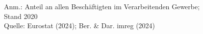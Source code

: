 \begin{figure}[p]
	{\centering {}}
	\label{map:mebeschanteil}
	\begin{spacing}{1} \scriptsize
		Anm.: Anteil an allen Beschäftigten im Verarbeitenden Gewerbe; Stand 2020\\
		Quelle: Eurostat (2024); Ber. \& Dar. imreg (2024) \end{spacing}
\end{figure}